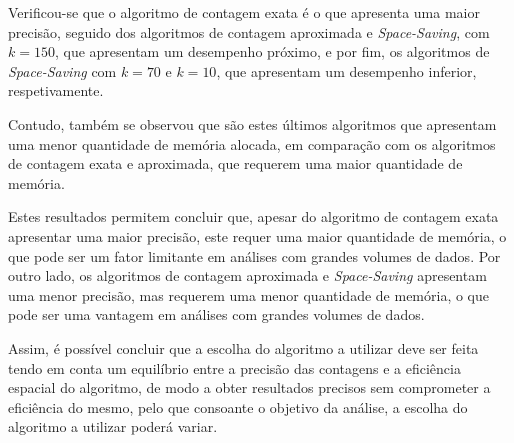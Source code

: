 \documentclass[mirror, portugues]{revdetua}
\begin{document}
Verificou-se que o algoritmo de contagem exata é o que apresenta uma maior precisão, seguido dos algoritmos de contagem aproximada e \textit{Space-Saving}, com $k = 150$, que apresentam um desempenho próximo, e por fim, os algoritmos de \textit{Space-Saving} com $k = 70$ e $k=10$, que apresentam um desempenho inferior, respetivamente. 

Contudo, também se observou que são estes últimos algoritmos que apresentam uma menor quantidade de memória alocada, em comparação com os algoritmos de contagem exata e aproximada, que requerem uma maior quantidade de memória.

Estes resultados permitem concluir que, apesar do algoritmo de contagem exata apresentar uma maior precisão, este requer uma maior quantidade de memória, o que pode ser um fator limitante em análises com grandes volumes de dados. Por outro lado, os algoritmos de contagem aproximada e \textit{Space-Saving} apresentam uma menor precisão, mas requerem uma menor quantidade de memória, o que pode ser uma vantagem em análises com grandes volumes de dados.

Assim, é possível concluir que a escolha do algoritmo a utilizar deve ser feita tendo em conta um equilíbrio entre a precisão das contagens e a eficiência espacial do algoritmo, de modo a obter resultados precisos sem comprometer a eficiência do mesmo, pelo que consoante o objetivo da análise, a escolha do algoritmo a utilizar poderá variar.


\end{document}
